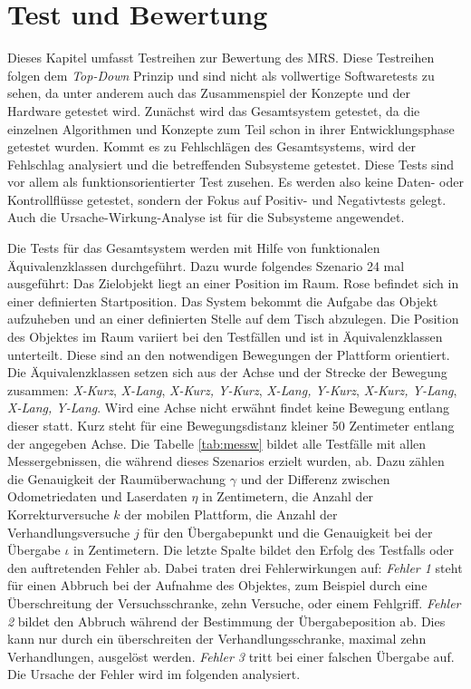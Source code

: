 \section{Test und Bewertung}
\label{sec:test}
Dieses Kapitel umfasst Testreihen zur Bewertung des MRS. Diese Testreihen folgen dem \textit{Top-Down} Prinzip und sind nicht als vollwertige Softwaretests zu sehen, da unter anderem auch das Zusammenspiel der Konzepte und der Hardware getestet wird. Zunächst wird das Gesamtsystem getestet, da die einzelnen Algorithmen und Konzepte zum Teil schon in ihrer Entwicklungsphase getestet wurden. Kommt es zu Fehlschlägen des Gesamtsystems, wird der Fehlschlag analysiert und die betreffenden Subsysteme getestet. Diese Tests sind vor allem als funktionsorientierter Test zusehen. Es werden also keine Daten- oder Kontrollflüsse getestet, sondern der Fokus auf Positiv- und Negativtests gelegt. Auch die Ursache-Wirkung-Analyse ist für die Subsysteme angewendet. 

Die Tests für das Gesamtsystem werden mit Hilfe von funktionalen Äquivalenzklassen durchgeführt. Dazu wurde folgendes Szenario 24 mal ausgeführt: Das Zielobjekt liegt an einer Position im Raum. Rose befindet sich in einer definierten Startposition. Das System bekommt die Aufgabe das Objekt aufzuheben und an einer definierten Stelle auf dem Tisch abzulegen. Die Position des Objektes im Raum variiert bei den Testfällen und ist in Äquivalenzklassen unterteilt. Diese sind an den notwendigen Bewegungen der Plattform orientiert. Die Äquivalenzklassen setzen sich aus der Achse und der Strecke der Bewegung zusammen: \textit{ X-Kurz}, \textit{ X-Lang}, \textit{ X-Kurz, Y-Kurz}, \textit{ X-Lang, Y-Kurz}, \textit{ X-Kurz, Y-Lang}, \textit{ X-Lang, Y-Lang}. Wird eine Achse nicht erwähnt findet keine Bewegung entlang dieser statt. Kurz steht für eine Bewegungsdistanz kleiner 50 Zentimeter entlang der angegeben Achse. Die Tabelle \ref{tab:messw} bildet alle Testfälle mit allen Messergebnissen, die während dieses Szenarios erzielt wurden, ab. Dazu zählen die Genauigkeit der Raumüberwachung $\gamma$ und der Differenz zwischen Odometriedaten und Laserdaten $\eta$ in Zentimetern, die Anzahl der Korrekturversuche $k$ der mobilen Plattform, die Anzahl der Verhandlungsversuche $j$ für den Übergabepunkt und die Genauigkeit bei der Übergabe $\iota$ in Zentimetern. Die letzte Spalte bildet den Erfolg des Testfalls oder den auftretenden Fehler ab. Dabei traten drei Fehlerwirkungen auf: \textit{Fehler 1} steht für einen Abbruch bei der Aufnahme des Objektes, zum Beispiel durch eine Überschreitung der Versuchsschranke, zehn Versuche, oder einem Fehlgriff. \textit{Fehler 2} bildet den Abbruch während der Bestimmung der Übergabeposition ab. Dies kann nur durch ein überschreiten der Verhandlungsschranke, maximal zehn Verhandlungen, ausgelöst werden. \textit{Fehler 3} tritt bei einer falschen Übergabe auf. Die Ursache der Fehler wird im folgenden analysiert. 

